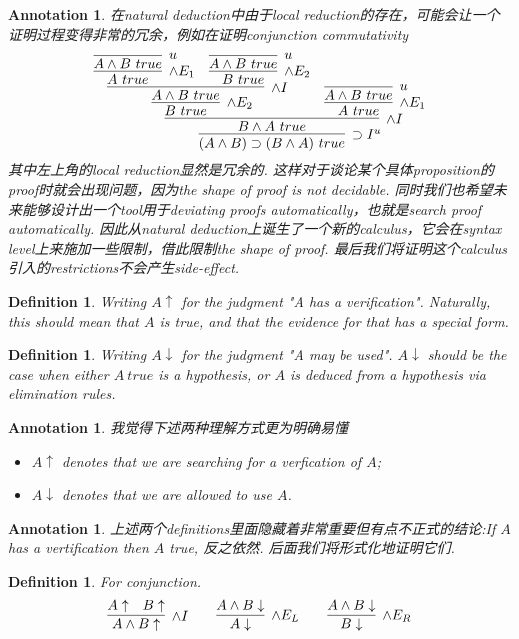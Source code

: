 \documentclass{article}
\theoremstyle{plain}
\newtheorem{definition}[theorem]{Definition}
\newtheorem{annotation}[theorem]{Annotation}
\newcounter{case}
\theoremstyle{nonumberplain}
\begin{document}
\begin{annotation}
\rm \cite{15-317-vu} 在natural deduction中由于local reduction的存在，可能会让一个证明过程变得非常的冗余，例如在证明conjunction commutativity
$$
\infer[\supset I^u]{(A \wedge B) \supset (B \wedge A)~true}{\infer[\wedge I]{B \wedge A~true}{\infer[\wedge E_2]{B~true}{\infer[\wedge I]{A \wedge B~true}{\infer[\wedge E_1]{A~true}{\infer[u]{A \wedge B ~true}{}}  &  \infer[\wedge E_2]{B~true}{\infer[u]{A \wedge B ~true}{}}}}  &  \infer[\wedge E_1]{A~true}{\infer[u]{A \wedge B ~true}{}}}}
$$
其中左上角的local reduction显然是冗余的. 这样对于谈论某个具体proposition的proof时就会出现问题，因为the shape of proof is not decidable. 同时我们也希望未来能够设计出一个tool用于deviating proofs automatically，也就是search proof automatically. 因此从natural deduction上诞生了一个新的calculus，它会在syntax level上来施加一些限制，借此限制the shape of proof. 最后我们将证明这个calculus引入的restrictions不会产生side-effect.   
\end{annotation}


\begin{definition}
\rm Writing $A\uparrow$ for the judgment "A has a verification". Naturally, this should mean that $A$ is true,  and that the evidence for that has a special form.
\end{definition}

\begin{definition}
\rm Writing $A\downarrow$ for the judgment "A may be used". $A\downarrow$ should be the case when either $A~true$ is a hypothesis, or $A$ is deduced from a hypothesis via elimination rules. 
\end{definition}

\begin{annotation}
\rm 我觉得下述两种理解方式更为明确易懂
\begin{itemize}
	\item $A \uparrow$ denotes that we are searching for a verfication of $A$;
	\item $A  \downarrow$ denotes that we are allowed to use $A$. 
\end{itemize}
\end{annotation}

\begin{annotation}
\rm 上述两个definitions里面隐藏着非常重要但有点不正式的结论:If $A$ has a vertification then $A$ true, 反之依然. 后面我们将形式化地证明它们. 
\end{annotation}

\begin{definition}
\rm For conjunction. 
$$
\begin{aligned}
&\infer[\wedge I]{A \wedge B\uparrow}{A \uparrow & B \uparrow} &&& \infer[\wedge E_L]{A \downarrow}{A \wedge B \downarrow} &&&& \infer[\wedge E_R]{B \downarrow}{A \wedge B \downarrow}
\end{aligned}
$$
\end{definition}
\end{document}
